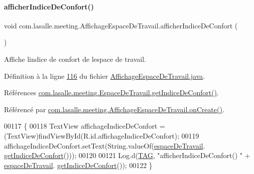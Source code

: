 \paragraph{\texorpdfstring{afficher\+Indice\+De\+Confort()}{afficherIndiceDeConfort()}}
{\footnotesize\ttfamily void com.\+lasalle.\+meeting.\+Affichage\+Espace\+De\+Travail.\+afficher\+Indice\+De\+Confort (\begin{DoxyParamCaption}{ }\end{DoxyParamCaption})}



Affiche l\textquotesingle{}indice de confort de l\textquotesingle{}espace de travail. 



Définition à la ligne \hyperlink{_affichage_espace_de_travail_8java_source_l00116}{116} du fichier \hyperlink{_affichage_espace_de_travail_8java_source}{Affichage\+Espace\+De\+Travail.\+java}.



Références \hyperlink{_espace_de_travail_8java_source_l00112}{com.\+lasalle.\+meeting.\+Espace\+De\+Travail.\+get\+Indice\+De\+Confort()}.



Référencé par \hyperlink{_affichage_espace_de_travail_8java_source_l00041}{com.\+lasalle.\+meeting.\+Affichage\+Espace\+De\+Travail.\+on\+Create()}.


\begin{DoxyCode}
00117     \{
00118         TextView affichageIndiceDeConfort = (TextView)findViewById(R.id.affichageIndiceDeConfort);
00119         affichageIndiceDeConfort.setText(String.valueOf(\hyperlink{classcom_1_1lasalle_1_1meeting_1_1_affichage_espace_de_travail_a934d41c1c41882b94b65a95cee5aca13}{espaceDeTravail}.
      \hyperlink{classcom_1_1lasalle_1_1meeting_1_1_espace_de_travail_a9d7b3bd8aa78a10c70851b477d0f522d}{getIndiceDeConfort}()));
00120 
00121         Log.d(\hyperlink{classcom_1_1lasalle_1_1meeting_1_1_affichage_espace_de_travail_a8606eb11c7b28f52226544de431d86a4}{TAG}, \textcolor{stringliteral}{"afficherIndiceDeConfort() "} + \hyperlink{classcom_1_1lasalle_1_1meeting_1_1_affichage_espace_de_travail_a934d41c1c41882b94b65a95cee5aca13}{espaceDeTravail}.
      \hyperlink{classcom_1_1lasalle_1_1meeting_1_1_espace_de_travail_a9d7b3bd8aa78a10c70851b477d0f522d}{getIndiceDeConfort}());
00122     \}
\end{DoxyCode}
\mbox{\label{classcom_1_1lasalle_1_1meeting_1_1_affichage_espace_de_travail_a86fc32986ef9ae8f6ef7fca78d91f648}} 
